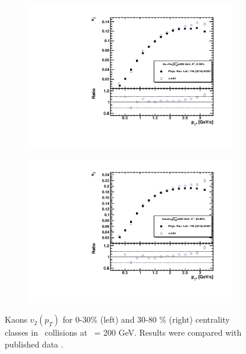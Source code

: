 \begin{figure}[ht]
    \begin{subfigure}{.49\textwidth}
        \centering
        \includegraphics[width=1.\linewidth]{Figures/v2_kaons_pt_cent0.pdf}
    \end{subfigure}
    \begin{subfigure}{.49\textwidth}
        \centering
        \includegraphics[width=1.\linewidth]{Figures/v2_kaons_pt_cent1.pdf}
    \end{subfigure}
    \label{fig:v2_EP_Kaons}
    \caption{Kaons $v_2(p_T)$ for 0-30\% (left) and 30-80 \% (right) centrality classes in \AuAu\ collisions at \sNN\ = 200 GeV. Results were compared with published data \cite{Adamczyk:2015ukd}.}
\end{figure}

